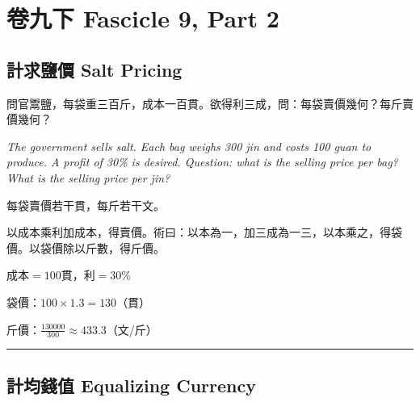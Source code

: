 \documentclass[11pt,a4paper]{article}
\newcommand{\longline}{\noindent\rule{\textwidth}{0.4pt}}
\begin{document}
\newpage

\section{卷九下 \quad Fascicle 9, Part 2}
\label{sec:fasc9b}

\begin{center}
\end{center}

\medskip

\subsection{計求鹽價 \quad Salt Pricing}

\begin{problem}
問官鬻鹽，每袋重三百斤，成本一百貫。欲得利三成，問：每袋賣價幾何？每斤賣價幾何？

\textit{The government sells salt. Each bag weighs 300 jin and costs 100 guan to produce. A profit of 30\% is desired. Question: what is the selling price per bag? What is the selling price per jin?}
\end{problem}

\begin{answer}
每袋賣價若干貫，每斤若干文。
\end{answer}

\begin{method}
以成本乘利加成本，得賣價。術曰：以本為一，加三成為一三，以本乘之，得袋價。以袋價除以斤數，得斤價。
\end{method}

\begin{working}
成本$=100$貫，利$=30\%$

袋價：$100 \times 1.3 = 130$（貫）

斤價：$\displaystyle\frac{130000}{300} \approx 433.3$（文/斤）
\end{working}

\vspace{0.5em}
\longline

\subsection{計均錢值 \quad Equalizing Currency}
\end{document}
